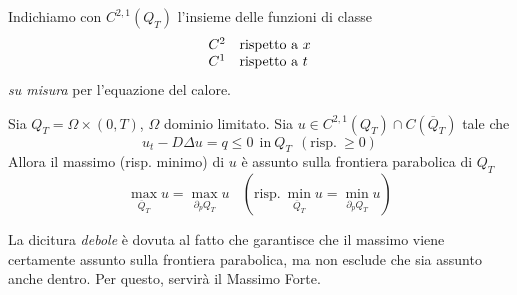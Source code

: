 \documentclass[10pt,a4paper,twoside,openright]{book}
\begin{document}
Indichiamo con $C^{2,1}(Q_{T})$ l'insieme delle funzioni di classe
\begin{equation*}
\begin{array}{ l l }
C^{2} & \text{rispetto a} \ x\\
C^{1} & \text{rispetto a} \ t
\end{array}
\end{equation*}
\textit{su misura} per l'equazione del calore.
\begin{theorem}
 Sia $Q_{T} =\Omega \times (0,T)$, $\Omega $ dominio limitato. Sia $u\in C^{2,1}(Q_{T}) \cap C(\overline{Q}_{T})$ tale che
\begin{equation*}
u_{t} -D\Delta u=q\leqslant 0\ \ \text{in} \ Q_{T} \ \ \left(\text{risp.} \ \geqslant 0\right)
\end{equation*}
Allora il massimo (risp. minimo) di $u$ è assunto sulla frontiera parabolica di $Q_{T}$
\begin{equation*}
\max_{\overline{Q}_{T}} u=\max_{\partial _{p} Q_{T}} u\ \ \ \ \left(\text{risp.} \ \min_{\overline{Q}_{T}} u=\min_{\partial _{p} Q_{T}} u\right)
\end{equation*}
\end{theorem}
La dicitura \emph{debole} è dovuta al fatto che garantisce che il massimo viene certamente assunto sulla frontiera parabolica, ma non esclude che sia assunto anche dentro. Per questo, servirà il Massimo Forte.
\end{document}
